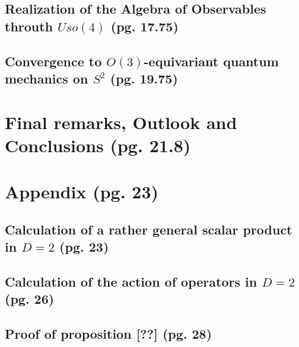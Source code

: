 \documentclass{article}
\begin{document}
\subsection{Realization of the Algebra of Observables throuth $Uso(4)$ (pg. 17.75)}

\subsection{Convergence to $O(3)$-equivariant quantum mechanics on $S^2$ (pg. 19.75)}

\section{Final remarks, Outlook and Conclusions (pg. 21.8)}

\section{Appendix (pg. 23)}

\subsection{Calculation of a rather general scalar product in $D=2$ (pg. 23)}

\subsection{Calculation of the action of operators in $D=2$ (pg. 26)}

\subsection{Proof of proposition [??] (pg. 28)}

\end{document}
